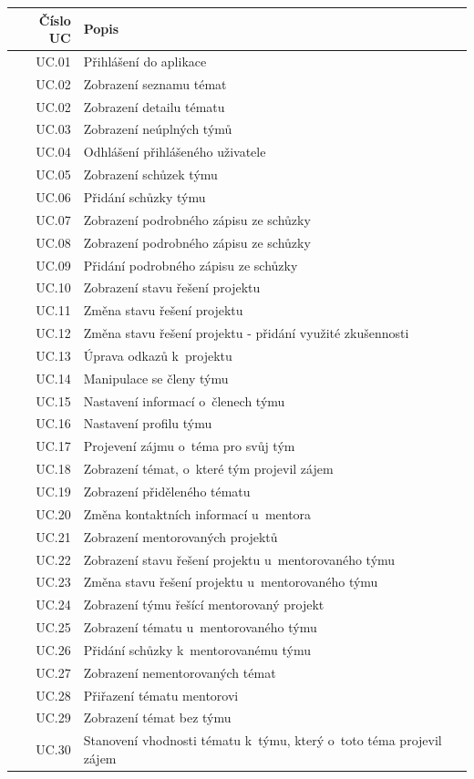 \documentclass[czech,BP]{thesiskiv}
\begin{document}
{\begin{table}[]
	\caption{Seznam případů užití}
	\label{tab:use-case-table}
	\centering
	\begin{xltabular}{\textwidth}{|r|X|}\hline
		Číslo UC & Popis\\\hline\hline
		UC.01	& Přihlášení do aplikace\\\hline
		UC.02	& Zobrazení seznamu témat\\\hline
		UC.02	& Zobrazení detailu tématu\\\hline
		UC.03	& Zobrazení neúplných týmů\\\hline
		UC.04	& Odhlášení přihlášeného uživatele\\\hline
		UC.05	& Zobrazení schůzek týmu\\\hline
		UC.06	& Přidání schůzky týmu\\\hline
		UC.07	& Zobrazení podrobného zápisu ze schůzky\\\hline
		UC.08	& Zobrazení podrobného zápisu ze schůzky\\\hline
		UC.09	& Přidání podrobného zápisu ze schůzky\\\hline
		UC.10	& Zobrazení stavu řešení projektu\\\hline
		UC.11	& Změna stavu řešení projektu\\\hline
		UC.12	& Změna stavu řešení projektu - přidání využité zkušennosti\\\hline
		UC.13	& Úprava odkazů k~projektu\\\hline
		UC.14	& Manipulace se členy týmu\\\hline
		UC.15	& Nastavení informací o~členech týmu\\\hline
		UC.16	& Nastavení profilu týmu\\\hline
		UC.17	& Projevení zájmu o~téma pro svůj tým\\\hline
		UC.18	& Zobrazení témat, o~které tým projevil zájem\\\hline
		UC.19	& Zobrazení přiděleného tématu\\\hline
		UC.20	& Změna kontaktních informací u~mentora\\\hline
		UC.21	& Zobrazení mentorovaných projektů\\\hline
		UC.22	& Zobrazení stavu řešení projektu u~mentorovaného týmu\\\hline
		UC.23	& Změna stavu řešení projektu u~mentorovaného týmu\\\hline
		UC.24	& Zobrazení týmu řešící mentorovaný projekt\\\hline
		UC.25	& Zobrazení tématu u~mentorovaného týmu\\\hline
		UC.26	& Přidání schůzky k~mentorovanému týmu\\\hline
		UC.27	& Zobrazení nementorovaných témat\\\hline
		UC.28	& Přiřazení tématu mentorovi\\\hline
		UC.29	& Zobrazení témat bez týmu\\\hline
		UC.30	& Stanovení vhodnosti tématu k~týmu, který o~toto téma projevil zájem\\\hline 
	\end{xltabular}


\end{table}}
\end{document}
